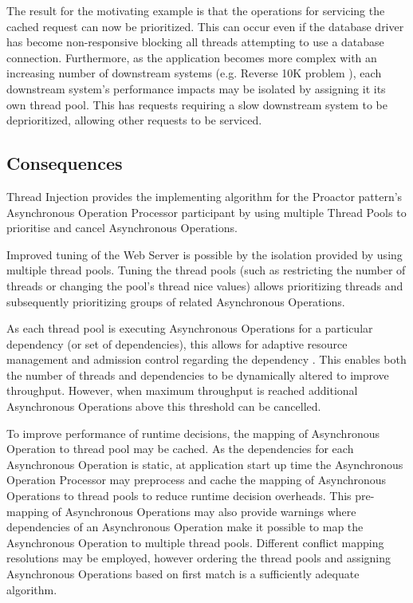\documentclass[prodmode]{style/acmlarge}
\begin{document}
The result for the motivating example is that the operations for servicing the
cached request can now be prioritized.  This can occur even if the database
driver has become non-responsive blocking all threads attempting to use a
database connection.  Furthermore, as the application becomes more complex with
an increasing number of downstream systems (e.g. Reverse 10K problem
\cite{reverse-ten-k-problem}), each downstream system's performance impacts may
be isolated by assigning it its own thread pool.  This has requests requiring a
slow downstream system to be deprioritized, allowing other requests to be
serviced.


\subsection{Consequences}


Thread Injection provides the implementing algorithm for the Proactor pattern's
Asynchronous Operation Processor participant by using multiple Thread Pools to
prioritise and cancel Asynchronous Operations.

Improved tuning of the Web Server is possible by the isolation provided by using
multiple thread pools.  Tuning the thread pools (such as restricting the number
of threads or changing the pool's thread nice values) allows prioritizing
threads and subsequently prioritizing groups of related Asynchronous Operations.

As each thread pool is executing Asynchronous Operations for a particular
dependency (or set of dependencies), this allows for adaptive resource
management and admission control regarding the dependency \cite{seda}.  This
enables both the number of threads and dependencies to be dynamically altered to
improve throughput.  However, when maximum throughput is reached additional
Asynchronous Operations above this threshold can be cancelled.

To improve performance of runtime decisions, the mapping of Asynchronous
Operation to thread pool may be cached.  As the dependencies for each
Asynchronous Operation is static, at application start up time the Asynchronous
Operation Processor may preprocess and cache the mapping of Asynchronous
Operations to thread pools to reduce runtime decision overheads.  This
pre-mapping of Asynchronous Operations may also provide warnings where
dependencies of an Asynchronous Operation make it possible to map the
Asynchronous Operation to multiple thread pools.  Different conflict mapping
resolutions may be employed, however ordering the thread pools and assigning
Asynchronous Operations based on first match is a sufficiently adequate
algorithm.
\end{document}
